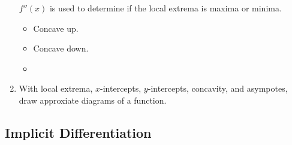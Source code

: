 \documentclass[12pt, a4paper]{article}
\begin{document}
\begin{enumerate}
    $f''(x)$ is used to determine if the local extrema is maxima or minima.
    \begin{itemize}
        \item {\color{red}{Minima: $f''(x)>0$}} Concave up.
        \item {\color{red}{Maxima: $f''(x)<0$}} Concave down.
        \item {}
    \end{itemize}
    \item With local extrema, $x$-intercepts, $y$-intercepts, concavity, and asympotes, draw approxiate diagrams of a function.
\end{enumerate}

\subsection{Implicit Differentiation}
\end{document}
